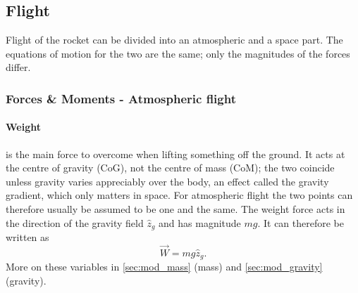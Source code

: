\subsection{Flight}
Flight of the rocket can be divided into an atmospheric and a space part. The equations of motion
for the two are the same; only the magnitudes of the forces differ.

\subsubsection{Forces \& Moments - Atmospheric flight}
\paragraph{Weight} is the main force to overcome when lifting something off the ground. It acts at
the centre of gravity (CoG), not the centre of mass (CoM); the two coincide unless gravity varies
appreciably over the body, an effect called the gravity gradient, which only matters in space. For
atmospheric flight the two points can therefore usually be assumed to be one and the same. The
weight force acts in the direction of the gravity field $\hat{z}_g$ and has magnitude $mg$. It can
therefore be written as
\begin{equation}
    \vec{W} = mg\hat{z}_g.
\end{equation}
More on these variables in \autoref{sec:mod_mass} (mass) and \autoref{sec:mod_gravity} (gravity).


